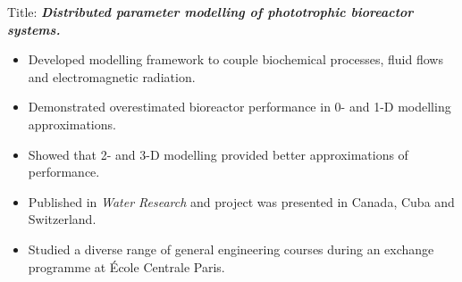 \vspace{0.2mm}
Title: \textbf{\textit{Distributed parameter modelling of phototrophic bioreactor systems.}}
\begin{itemize}
    \item Developed modelling framework to couple biochemical processes, fluid flows and electromagnetic radiation.
    \item Demonstrated overestimated bioreactor performance in 0- and 1-D modelling approximations.
    \item Showed that 2- and 3-D modelling provided better approximations of performance.
    \item Published in \textit{Water Research} and project was presented in Canada, Cuba and Switzerland. 
\end{itemize}
\divider\smallskip


\begin{itemize}
\item Studied a diverse range of general engineering courses during an exchange programme at \'Ecole Centrale Paris.
\end{itemize}






